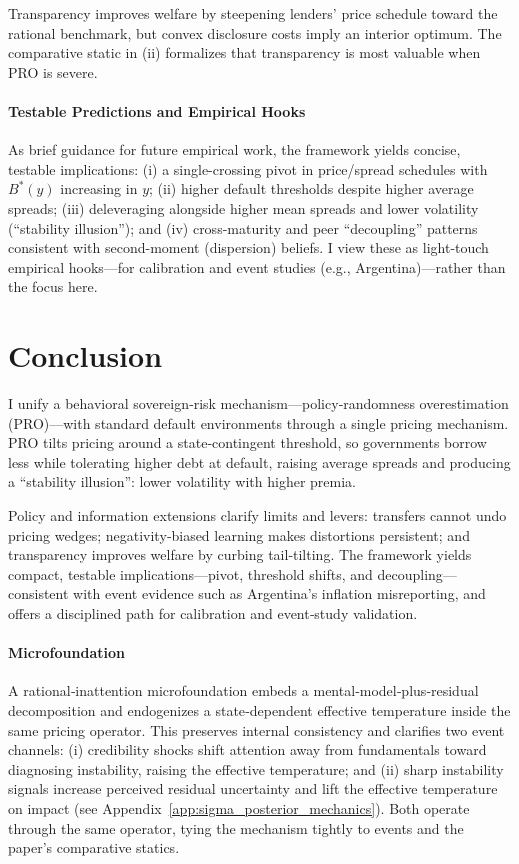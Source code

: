 \documentclass[12pt]{article}
\theoremstyle{plain}
\begin{document}
Transparency improves welfare by steepening lenders' price schedule toward the
rational benchmark, but convex disclosure costs imply an interior optimum. The
comparative static in (ii) formalizes that transparency is most valuable when
PRO is severe.

\paragraph{Testable Predictions and Empirical Hooks}
As brief guidance for future empirical work, the framework yields concise,
testable implications: (i) a single-crossing pivot in price/spread schedules
with $B^*(y)$ increasing in $y$; (ii) higher default thresholds despite higher
average spreads; (iii) deleveraging alongside higher mean spreads and lower
volatility (``stability illusion''); and (iv) cross-maturity and peer
``decoupling'' patterns consistent with second-moment (dispersion) beliefs. I
view these as light-touch empirical hooks—for calibration and event studies
(e.g., Argentina)—rather than the focus here.

\section{Conclusion}

I unify a behavioral sovereign‑risk mechanism—policy‑randomness overestimation
(PRO)—with standard default environments through a single pricing mechanism.
PRO tilts pricing around a state‑contingent threshold, so governments borrow
less while tolerating higher debt at default, raising average spreads and
producing a “stability illusion”: lower volatility with higher premia.

Policy and information extensions clarify limits and levers: transfers cannot
undo pricing wedges; negativity‑biased learning makes distortions persistent;
and transparency improves welfare by curbing tail‑tilting. The framework yields
compact, testable implications—pivot, threshold shifts, and
decoupling—consistent with event evidence such as Argentina’s inflation
misreporting, and offers a disciplined path for calibration and event‑study
validation.

\paragraph{Microfoundation} A rational‑inattention microfoundation embeds a mental‑model‑plus‑residual
decomposition and endogenizes a state‑dependent effective temperature inside
the same pricing operator. This preserves internal consistency and clarifies
two event channels: (i) credibility shocks shift attention away from
fundamentals toward diagnosing instability, raising the effective temperature;
and (ii) sharp instability signals increase perceived residual uncertainty and
lift the effective temperature on impact (see
Appendix~\ref{app:sigma_posterior_mechanics}). Both operate through the same
operator, tying the mechanism tightly to events and the paper’s comparative
statics.
\end{document}
